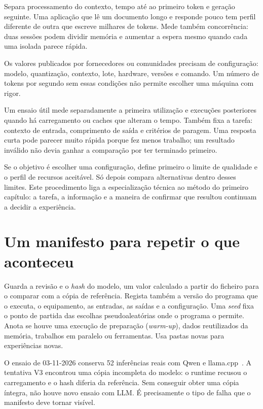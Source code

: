 Separa processamento do contexto, tempo até ao primeiro token e geração seguinte. Uma aplicação que lê um documento longo e responde pouco tem perfil diferente de outra que escreve milhares de tokens. Mede também concorrência: duas sessões podem dividir memória e aumentar a espera mesmo quando cada uma isolada parece rápida.

Os valores publicados por fornecedores ou comunidades precisam de configuração: modelo, quantização, contexto, lote, hardware, versões e comando. Um número de tokens por segundo sem essas condições não permite escolher uma máquina com rigor.

Um ensaio útil mede separadamente a primeira utilização e execuções posteriores quando há carregamento ou caches que alteram o tempo. Também fixa a tarefa: contexto de entrada, comprimento de saída e critérios de paragem. Uma resposta curta pode parecer muito rápida porque fez menos trabalho; um resultado inválido não devia ganhar a comparação por ter terminado primeiro.

Se o objetivo é escolher uma configuração, define primeiro o limite de qualidade e o perfil de recursos aceitável. Só depois compara alternativas dentro desses limites. Este procedimento liga a especialização técnica ao método do primeiro capítulo: a tarefa, a informação e a maneira de confirmar que resultou continuam a decidir a experiência.

\section{Um manifesto para repetir o que aconteceu}
Guarda a revisão e o \emph{hash} do modelo, um valor calculado a partir do ficheiro para o comparar com a cópia de referência. Regista também a versão do programa que o executa, o equipamento, as entradas, as saídas e a configuração. Uma \emph{seed} fixa o ponto de partida das escolhas pseudoaleatórias onde o programa o permite. Anota se houve uma execução de preparação (\emph{warm-up}), dados reutilizados da memória, trabalhos em paralelo ou ferramentas. Usa pastas novas para experiências novas.

O ensaio de 03-11-2026 conserva 52 inferências reais com Qwen e llama.cpp~\citep{qwengguf,llamacpp}. A tentativa V3 encontrou uma cópia incompleta do modelo: o runtime recusou o carregamento e o hash diferia da referência. Sem conseguir obter uma cópia íntegra, não houve novo ensaio com LLM. É precisamente o tipo de falha que o manifesto deve tornar visível.

